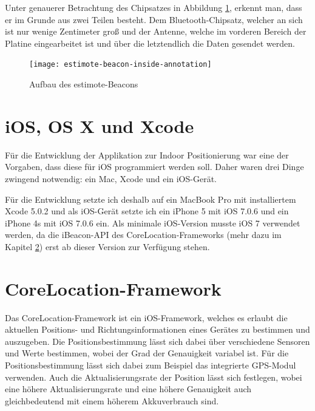 Unter genauerer Betrachtung des Chipsatzes in Abbildung \ref{estimote-beacon-inside-annotations}, erkennt man, dass er im Grunde aus zwei Teilen besteht.
Dem Bluetooth-Chipsatz, welcher an sich ist nur wenige Zentimeter groß und der Antenne, welche im vorderen Bereich der Platine eingearbeitet ist und über die letztendlich die Daten gesendet werden.

\begin{figure}[h!]
	\centering
	\texttt{[image: estimote-beacon-inside-annotation]}
	\caption{Aufbau des estimote-Beacons}
	\label{estimote-beacon-inside-annotations}
\end{figure}



\section{iOS, OS X und Xcode}
\label{sec:technologies:iosandxcode}
Für die Entwicklung der Applikation zur Indoor Positionierung war eine der Vorgaben, dass diese für iOS programmiert werden soll.
Daher waren drei Dinge zwingend notwendig: ein Mac, Xcode und ein iOS-Gerät.

Für die Entwicklung setzte ich deshalb auf ein MacBook Pro mit installiertem Xcode 5.0.2 und als iOS-Gerät setzte ich ein iPhone 5 mit iOS 7.0.6 und ein iPhone 4s mit iOS 7.0.6 ein.
Als minimale iOS-Version musste iOS 7 verwendet werden, da die iBeacon-API des CoreLocation-Frameworks (mehr dazu im Kapitel \ref{sec:technologies:corelocation}) erst ab dieser Version zur Verfügung stehen.


\section{CoreLocation-Framework}
\label{sec:technologies:corelocation}
Das CoreLocation-Framework ist ein iOS-Framework, welches es erlaubt die aktuellen Positions- und Richtungsinformationen eines Gerätes zu bestimmen und auszugeben.
Die Positionsbestimmung lässt sich dabei über verschiedene Sensoren und Werte bestimmen, wobei der Grad der Genauigkeit variabel ist.
Für die Positionsbestimmung lässt sich dabei zum Beispiel das integrierte GPS-Modul verwenden.
Auch die Aktualisierungsrate der Position lässt sich festlegen, wobei eine höhere Aktualisierungsrate und eine höhere Genauigkeit auch gleichbedeutend mit einem höherem Akkuverbrauch sind.

